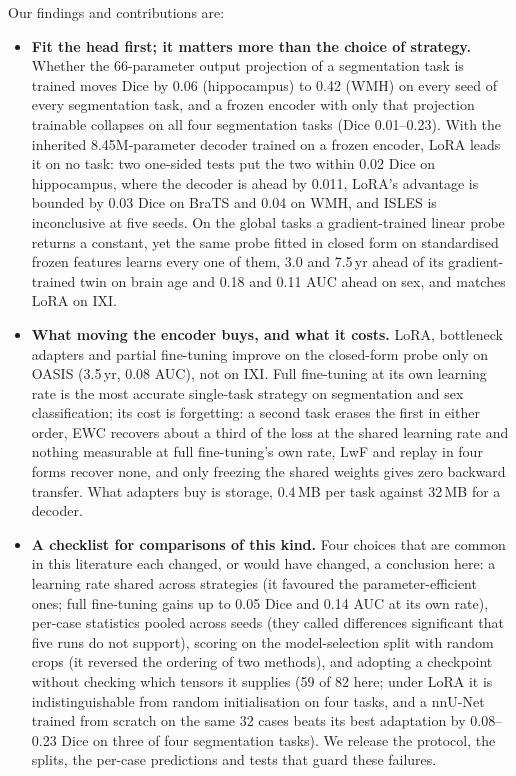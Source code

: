 \iffull\documentclass[journal]{IEEEtran}\else\documentclass[journal,twoside,web]{ieeecolor}\usepackage{generic}\fi
\begin{document}
Our findings and contributions are:
\begin{itemize}
\item \textbf{Fit the head first; it matters more than the choice of strategy.} Whether the 66-parameter output projection of a segmentation task is trained moves Dice by 0.06 (hippocampus) to 0.42 (WMH) on every seed of every segmentation task, and a frozen encoder with only that projection trainable collapses on all four segmentation tasks (Dice 0.01--0.23). With the inherited 8.45M-parameter decoder trained on a frozen encoder, LoRA leads it on no task: two one-sided tests put the two within 0.02 Dice on hippocampus, where the decoder is ahead by 0.011, LoRA's advantage is bounded by 0.03 Dice on BraTS and 0.04 on WMH, and ISLES is inconclusive at five seeds. On the global tasks a gradient-trained linear probe returns a constant, yet the same probe fitted in closed form on standardised frozen features learns every one of them, 3.0 and 7.5\,yr ahead of its gradient-trained twin on brain age and 0.18 and 0.11 AUC ahead on sex, and matches LoRA on IXI.
\item \textbf{What moving the encoder buys, and what it costs.} LoRA, bottleneck adapters and partial fine-tuning improve on the closed-form probe only on OASIS (3.5\,yr, 0.08 AUC), not on IXI. Full fine-tuning at its own learning rate is the most accurate single-task strategy on segmentation and sex classification; its cost is forgetting: a second task erases the first in either order, EWC recovers about a third of the loss at the shared learning rate and nothing measurable at full fine-tuning's own rate, LwF and replay in four forms recover none, and only freezing the shared weights gives zero backward transfer. What adapters buy is storage, 0.4\,MB per task against 32\,MB for a decoder.
\item \textbf{A checklist for comparisons of this kind.} Four choices that are common in this literature each changed, or would have changed, a conclusion here: a learning rate shared across strategies (it favoured the parameter-efficient ones; full fine-tuning gains up to 0.05 Dice and 0.14 AUC at its own rate), per-case statistics pooled across seeds (they called differences significant that five runs do not support), scoring on the model-selection split with random crops (it reversed the ordering of two methods), and adopting a checkpoint without checking which tensors it supplies (59 of 82 here; under LoRA it is indistinguishable from random initialisation on four tasks, and a nnU-Net trained from scratch on the same 32 cases beats its best adaptation by 0.08--0.23 Dice on three of four segmentation tasks). We release the protocol, the splits, the per-case predictions and tests that guard these failures.
\end{itemize}
\end{document}
